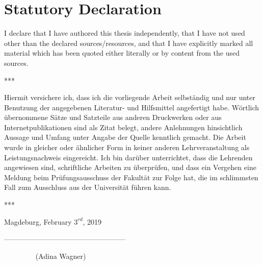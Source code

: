 \documentclass[a4paper, 11pt]{scrreprt}
\begin{document}





\chapter*{Statutory Declaration}

I declare that I have authored this thesis independently, that I have not used
other than the declared sources/resources, and that I have explicitly marked
all material which has been quoted either literally or by content from the
used sources.

\bigskip

\begin{center}
	***
\end{center}

\bigskip

Hiermit versichere ich, dass ich die vorliegende Arbeit selbständig und nur
unter Benutzung der angegebenen Literatur- und Hilfsmittel angefertigt
habe. Wörtlich übernommene Sätze und Satzteile aus anderen Druckwerken
oder aus Internetpublikationen sind als Zitat belegt, andere Anlehnungen
hinsichtlich Aussage und Umfang unter Angabe der Quelle kenntlich gemacht.
Die Arbeit wurde in gleicher oder ähnlicher Form in keiner anderen
Lehrveranstaltung als Leistungsnachweis eingereicht.
Ich bin darüber unterrichtet, dass die Lehrenden angewiesen sind, schriftliche
 Arbeiten zu überprüfen, und dass ein Vergehen eine Meldung beim
Prüfungsausschuss der Fakultät zur Folge hat, die im schlimmsten Fall zum
Ausschluss aus der Universität führen kann.

\bigskip

\begin{center}
	***
\end{center}

\bigskip

Magdeburg, February $3^{rd}$, 2019

\bigskip

\bigskip

\bigskip

---------------------------------------------------

$\phantom{mmmm..}$  (Adina Wagner)
\end{document}
